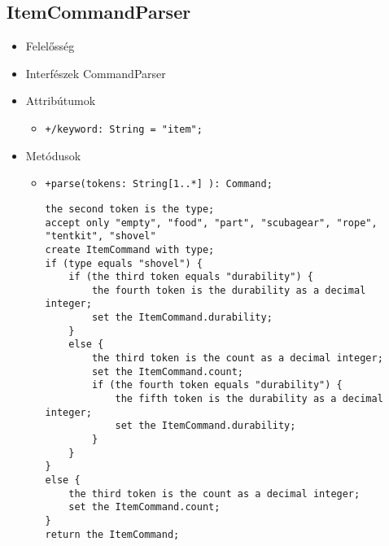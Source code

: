 \subsection{ItemCommandParser}
\begin{itemize}
\item Felelősség\newline
\item Interfészek\newline
CommandParser
\item Attribútumok
	\begin{itemize}
		\item \texttt{+/keyword: String = "item";}
	\end{itemize}
\item Metódusok
\begin{itemize}
		\item \texttt{+parse(tokens: String[1..*] ): Command;}
		\begin{lstlisting}
the second token is the type;
accept only "empty", "food", "part", "scubagear", "rope", "tentkit", "shovel"
create ItemCommand with type;
if (type equals "shovel") {
	if (the third token equals "durability") {
		the fourth token is the durability as a decimal integer;
		set the ItemCommand.durability;
	}
	else {
		the third token is the count as a decimal integer;
		set the ItemCommand.count;
		if (the fourth token equals "durability") {
			the fifth token is the durability as a decimal integer;
			set the ItemCommand.durability;
		}
	}
}
else {
	the third token is the count as a decimal integer;
	set the ItemCommand.count;
}
return the ItemCommand;
		\end{lstlisting}
	\end{itemize}
\end{itemize}

